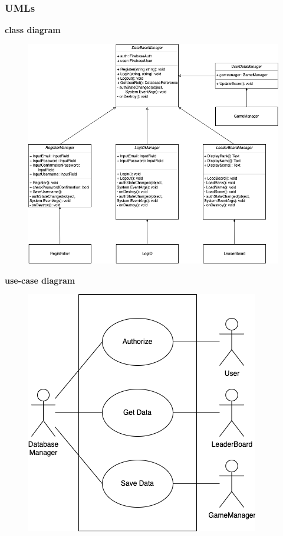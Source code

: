 \documentclass[11pt]{article}
\begin{document}
\subsubsection{UMLs}
\textbf{class diagram}\\
\begin{figure}[H]
    \centering
    \includegraphics*[scale=0.4]{Database_Class.drawio.png}
\end{figure}
\textbf{use-case diagram}\\
\begin{figure}[H]
    \centering
    \includegraphics*[scale=0.4]{Database_use-case.png}
\end{figure}
\end{document}

